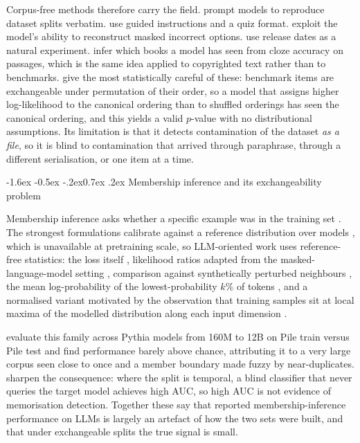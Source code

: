 \documentclass[10pt,twocolumn,letterpaper]{article}
\makeatletter
\renewcommand\subsection{\@startsection{subsection}{2}{\z@}%
  {-1.6ex \@plus -0.5ex \@minus -.2ex}{0.7ex \@plus .2ex}%
  {\normalfont\normalsize\bfseries}}
\makeatother
\begin{document}
Corpus-free methods therefore carry the field. \citet{sainz2023trouble} prompt models to reproduce dataset splits verbatim. \citet{golchin2024timetravel} use guided instructions and a quiz format. \citet{deng2024investigating} exploit the model's ability to reconstruct masked incorrect options. \citet{li2024task} use release dates as a natural experiment. \citet{chang2023speak} infer which books a model has seen from cloze accuracy on passages, which is the same idea applied to copyrighted text rather than to benchmarks. \citet{oren2024proving} give the most statistically careful of these: benchmark items are exchangeable under permutation of their order, so a model that assigns higher log-likelihood to the canonical ordering than to shuffled orderings has seen the canonical ordering, and this yields a valid $p$-value with no distributional assumptions. Its limitation is that it detects contamination of the dataset \emph{as a file}, so it is blind to contamination that arrived through paraphrase, through a different serialisation, or one item at a time.

\subsection{Membership inference and its exchangeability problem}

Membership inference asks whether a specific example was in the training set \cite{shokri2017mia,yeom2018privacy}. The strongest formulations calibrate against a reference distribution over models \cite{carlini2022firstprinciples}, which is unavailable at pretraining scale, so LLM-oriented work uses reference-free statistics: the loss itself \cite{yeom2018privacy}, likelihood ratios adapted from the masked-language-model setting \cite{mireshghallah2022quantifying}, comparison against synthetically perturbed neighbours \cite{mattern2023neighbourhood}, the mean log-probability of the lowest-probability $k$\% of tokens \cite{shi2024minkprob}, and a normalised variant motivated by the observation that training samples sit at local maxima of the modelled distribution along each input dimension \cite{zhang2025minkpp}.

\citet{duan2024mia} evaluate this family across Pythia models from 160M to 12B on Pile train versus Pile test and find performance barely above chance, attributing it to a very large corpus seen close to once and a member boundary made fuzzy by near-duplicates. \citet{das2024blind} sharpen the consequence: where the split is temporal, a blind classifier that never queries the target model achieves high AUC, so high AUC is not evidence of memorisation detection. Together these say that reported membership-inference performance on LLMs is largely an artefact of how the two sets were built, and that under exchangeable splits the true signal is small.
\end{document}
